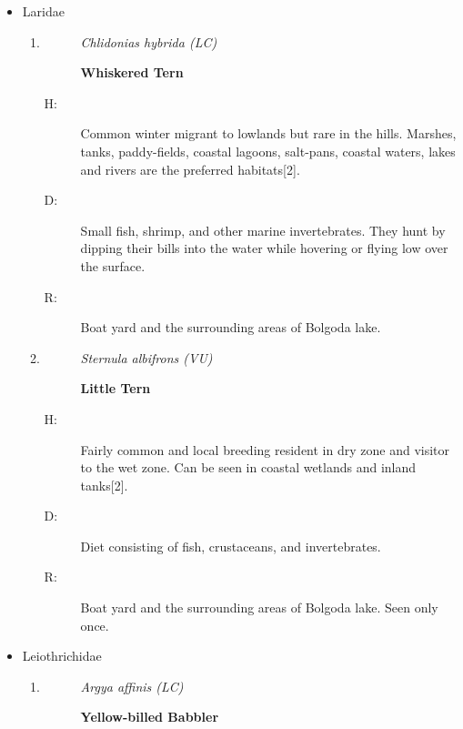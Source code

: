 \begin{itemize}
\begin{enumerate}
\begin{description}
\end{description}%
\end{enumerate}%
\item%
Laridae%
\begin{enumerate}%
\item%
\begin{description}%
\item[]%
\textit{Chlidonias hybrida (LC)}%
\item[]%
\textbf{Whiskered Tern}%
\end{description}%
\begin{description}%
\item[H: ]%
Common winter migrant to lowlands but rare in the hills. Marshes, tanks, paddy-fields, coastal lagoons, salt{-}pans, coastal waters, lakes and rivers are the preferred habitats{[}2{]}.%
\item[D: ]%
Small fish, shrimp, and other marine invertebrates. They hunt by dipping their bills into the water while hovering or flying low over the surface.%
\item[R: ]%
Boat yard and the surrounding areas of Bolgoda lake.%
\end{description}%
\item%
\begin{description}%
\item[]%
\textit{Sternula albifrons (VU)}%
\item[]%
\textbf{Little Tern}%
\end{description}%
\begin{description}%
\item[H: ]%
Fairly common and local breeding resident in dry zone and visitor to the wet zone. Can be seen in coastal wetlands and inland tanks{[}2{]}.%
\item[D: ]%
Diet consisting of fish, crustaceans, and invertebrates.%
\item[R: ]%
Boat yard and the surrounding areas of Bolgoda lake. Seen only once.%
\end{description}%
\end{enumerate}%
\item%
Leiothrichidae%
\begin{enumerate}%
\item%
\begin{description}%
\item[]%
\textit{Argya affinis (LC)}%
\item[]%
\textbf{Yellow{-}billed Babbler}%
\end{description}%

\end{enumerate}
\end{itemize}
